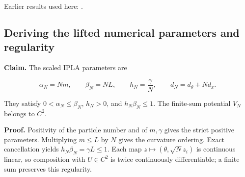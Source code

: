 \documentclass[11pt,a4paper]{report}
\begin{document}
Earlier results used here: \cite[Section~3.1]{LangevinLean2026IPLA}.
\subsection{\texorpdfstring{Deriving the lifted numerical parameters and regularity}{Deriving the lifted numerical parameters and regularity}}
\label{report-step-WassersteinMixing-IPLACurvature-lean-1}


\textbf{Claim.} The scaled IPLA parameters are

\[\alpha_N=Nm,\qquad\beta_N=NL,\qquad h_N=\frac{\gamma}{N},\qquad d_N=d_\theta+Nd_x.\]


They satisfy \(0<\alpha_N\le\beta_N\), \(h_N>0\), and \(h_N\beta_N\le1\). The finite-sum potential \(V_N\) belongs to \(C^2\).




\textbf{Proof.} Positivity of the particle number and of \(m,\gamma\) gives the strict positive parameters. Multiplying \(m\le L\) by \(N\) gives the curvature ordering. Exact cancellation yields \(h_N\beta_N=\gamma L\le1\). Each map \(z\mapsto(\theta,\sqrt N z_i)\) is continuous linear, so composition with \(U\in C^2\) is twice continuously differentiable; a finite sum preserves this regularity.
\end{document}
